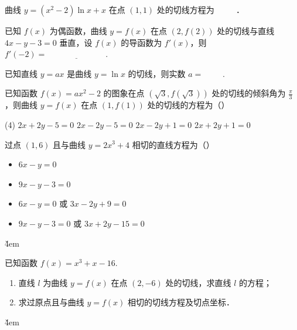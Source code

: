 \begin{example}
    曲线 $y=\left(x^2-2\right) \ln x+x$ 在点 $(1,1)$ 处的切线方程为 \underline{$\qquad$} ．
\end{example}

\vspace{4em}

\begin{example}
    已知 $f(x)$ 为偶函数，曲线 $y = f(x)$ 在点 $(2,f(2))$ 处的切线与直线 $4x - y - 3 = 0$ 垂直，设 $f(x)$ 的导函数为 $f'(x)$，则 $f'(-2) = \underline{\hspace{3cm}}$.
\end{example}

\vspace{4em}

\begin{example}
    已知直线 $y=a x$ 是曲线 $y=\ln x$ 的切线，则实数 $a=$ \underline{$\qquad$}.
\end{example}

\vspace{4em}

\begin{example}
    已知函数 $f(x)=a x^2-2$ 的图象在点 $(\sqrt{3}, f(\sqrt{3}))$ 处的切线的倾斜角为 $\frac{\pi}{3}$ ，则曲线 $y=f(x)$ 在点 $(1, f(1))$ 处的切线的方程为（\quad）
    \begin{tasks}(4)
        \task $2 x+2 y-5=0$
        \task $2 x-2 y-5=0$
        \task $2 x-2 y+1=0$
        \task $2 x+2 y+1=0$
    \end{tasks}
\end{example}

\begin{example}
    过点 $(1,6)$ 且与曲线 $y=2 x^3+4$ 相切的直线方程为（\quad）
    \begin{itemize}
        \item $6 x-y=0$
        \item $9 x-y-3=0$
        \item $6 x-y=0$ 或 $3 x-2 y+9=0$
        \item $9 x-y-3=0$ 或 $3 x+2 y-15=0$
    \end{itemize}
\end{example}

\v{4em}

\begin{example}
    已知函数 $f(x) = x^{3} + x - 16$.
    \begin{enumerate}
        \item[(1)] 直线 $l$ 为曲线 $y = f(x)$ 在点 $(2, -6)$ 处的切线，求直线 $l$ 的方程；
        \item[(2)] 求过原点且与曲线 $y = f(x)$ 相切的切线方程及切点坐标．
    \end{enumerate}
\end{example}

\v{4em}
